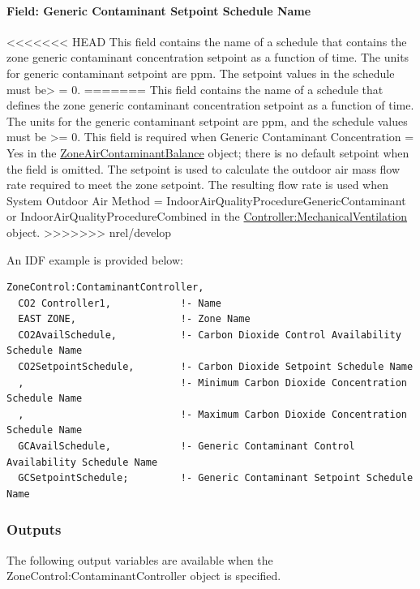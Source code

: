 \paragraph{Field: Generic Contaminant Setpoint Schedule Name}\label{field-generic-contaminant-setpoint-schedule-name}

<<<<<<< HEAD
This field contains the name of a schedule that contains the zone generic contaminant concentration setpoint as a function of time. The units for generic contaminant setpoint are ppm. The setpoint values in the schedule must be\textgreater{} = 0.
=======
This field contains the name of a schedule that defines the zone generic contaminant concentration setpoint as a function of time. The units for the generic contaminant setpoint are ppm, and the schedule values must be \textgreater{}= 0. This field is required when Generic Contaminant Concentration = Yes in the \hyperref[zoneaircontaminantbalance]{ZoneAirContaminantBalance} object; there is no default setpoint when the field is omitted. The setpoint is used to calculate the outdoor air mass flow rate required to meet the zone setpoint. The resulting flow rate is used when System Outdoor Air Method = IndoorAirQualityProcedureGenericContaminant or IndoorAirQualityProcedureCombined in the \hyperref[controllermechanicalventilation]{Controller:MechanicalVentilation} object.
>>>>>>> nrel/develop

An IDF example is provided below:

\begin{lstlisting}
ZoneControl:ContaminantController,
  CO2 Controller1,            !- Name
  EAST ZONE,                  !- Zone Name
  CO2AvailSchedule,           !- Carbon Dioxide Control Availability Schedule Name
  CO2SetpointSchedule,        !- Carbon Dioxide Setpoint Schedule Name
  ,                           !- Minimum Carbon Dioxide Concentration Schedule Name
  ,                           !- Maximum Carbon Dioxide Concentration Schedule Name
  GCAvailSchedule,            !- Generic Contaminant Control Availability Schedule Name
  GCSetpointSchedule;         !- Generic Contaminant Setpoint Schedule Name
\end{lstlisting}

\subsubsection{Outputs}\label{outputs-4-020}

The following output variables are available when the ZoneControl:ContaminantController object is specified.

